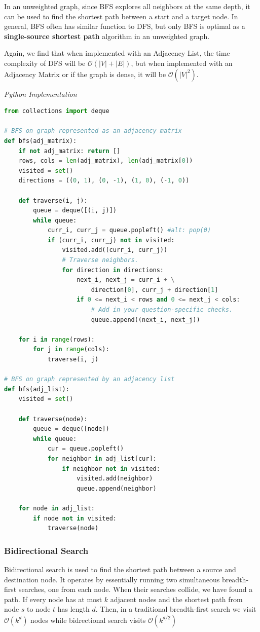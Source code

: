 \documentclass{article}
\newcommand{\bigO}{\mathcal{O}}
\begin{document}
    In an unweighted graph, since BFS explores all neighbors at the same depth, it can be used to find the shortest path between a start and a target node. In general, BFS often has similar function to DFS, but only BFS is optimal as a \textbf{single-source shortest path} algorithm in an unweighted graph.

    Again, we find that when implemented with an Adjacency List, the time complexity of DFS will be $\bigO(|V| + |E|)$, but when implemented with an Adjacency Matrix or if the graph is dense, it will be $\bigO(|V|^2)$.
    
\vspace{8pt} \emph{Python Implementation}
\begin{lstlisting}[language=Python]
from collections import deque

# BFS on graph represented as an adjacency matrix
def bfs(adj_matrix):
    if not adj_matrix: return []
    rows, cols = len(adj_matrix), len(adj_matrix[0])
    visited = set()
    directions = ((0, 1), (0, -1), (1, 0), (-1, 0))

    def traverse(i, j):
        queue = deque([(i, j)])
        while queue:
            curr_i, curr_j = queue.popleft() #alt: pop(0)
            if (curr_i, curr_j) not in visited:
                visited.add((curr_i, curr_j))
                # Traverse neighbors.
                for direction in directions:
                    next_i, next_j = curr_i + \
                        direction[0], curr_j + direction[1]
                    if 0 <= next_i < rows and 0 <= next_j < cols:
                        # Add in your question-specific checks.
                        queue.append((next_i, next_j))

    for i in range(rows):
        for j in range(cols):
            traverse(i, j)
            
# BFS on graph represented by an adjacency list 
def bfs(adj_list):
    visited = set()
    
    def traverse(node):
        queue = deque([node])
        while queue:
            cur = queue.popleft()
            for neighbor in adj_list[cur]:
                if neighbor not in visited:
                    visited.add(neighbor)
                    queue.append(neighbor)
                    
    for node in adj_list:
        if node not in visited:
            traverse(node)
\end{lstlisting}



    \subsubsection{Bidirectional Search}
    Bidirectional search is used to find the shortest path between a source and destination node. It operates by essentially running two simultaneous breadth-first searches, one from each node. When their searches collide, we have found a path.  If every node has at most $k$ adjacent nodes and the shortest path from node $s$ to node $t$ has length $d$. Then, in a traditional breadth-first search we visit $\mathcal{O}(k^d)$ nodes while bidrectional search visits $\mathcal{O}(k^{d/2})$
\end{document}
